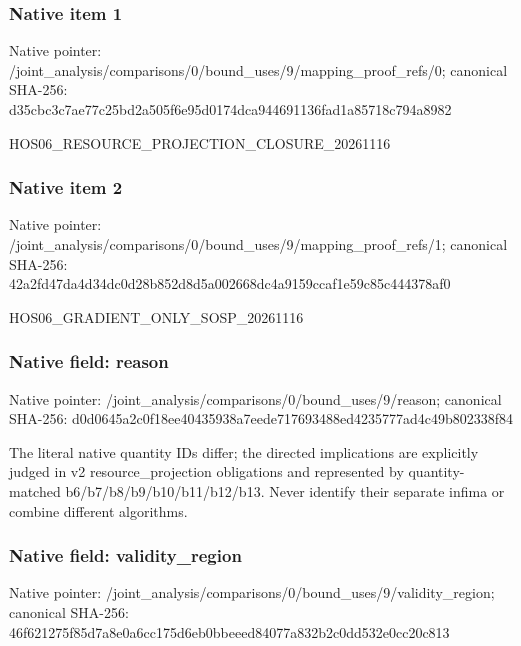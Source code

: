 \documentclass[10pt,a4paper]{article}
\begin{document}
\subsubsection{Native item 1}
Native pointer: /joint\_\allowbreak{}analysis/comparisons/0/bound\_\allowbreak{}uses/9/mapping\_\allowbreak{}proof\_\allowbreak{}refs/0; canonical SHA-256: d35cbc3c7ae77c25bd2a505f6e95d0174dca944691136fad1a85718c794a8982

\begingroup\raggedright\sloppy HOS06\_\allowbreak{}RESOURCE\_\allowbreak{}PROJECTION\_\allowbreak{}CLOSURE\_\allowbreak{}20261116\par\endgroup

\subsubsection{Native item 2}
Native pointer: /joint\_\allowbreak{}analysis/comparisons/0/bound\_\allowbreak{}uses/9/mapping\_\allowbreak{}proof\_\allowbreak{}refs/1; canonical SHA-256: 42a2fd47da4d34dc0d28b852d8d5a002668dc4a9159ccaf1e59c85c444378af0

\begingroup\raggedright\sloppy HOS06\_\allowbreak{}GRADIENT\_\allowbreak{}ONLY\_\allowbreak{}SOSP\_\allowbreak{}20261116\par\endgroup

\subsubsection{Native field: reason}
Native pointer: /joint\_\allowbreak{}analysis/comparisons/0/bound\_\allowbreak{}uses/9/reason; canonical SHA-256: d0d0645a2c0f18ee40435938a7eede717693488ed4235777ad4c49b802338f84

\begingroup\raggedright\sloppy The literal native quantity IDs differ;\allowbreak{} the directed implications are explicitly judged in v2 resource\_\allowbreak{}projection obligations and represented by quantity-matched b6/\allowbreak{}b7/\allowbreak{}b8/\allowbreak{}b9/\allowbreak{}b10/\allowbreak{}b11/\allowbreak{}b12/\allowbreak{}b13. Never identify their separate infima or combine different algorithms.\par\endgroup

\subsubsection{Native field: validity\_\allowbreak{}region}
Native pointer: /joint\_\allowbreak{}analysis/comparisons/0/bound\_\allowbreak{}uses/9/validity\_\allowbreak{}region; canonical SHA-256: 46f621275f85d7a8e0a6cc175d6eb0bbeeed84077a832b2c0dd532e0cc20c813
\end{document}
